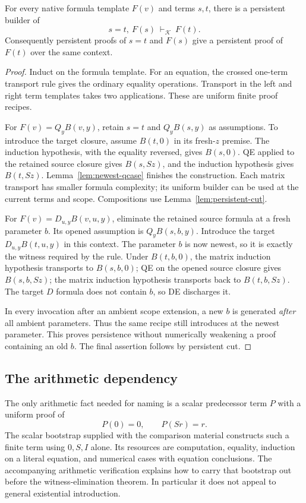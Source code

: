\begin{lemma}
\label{lem:newest-transport}
For every native formula template $F(v)$ and terms $s,t$, there is a
persistent builder of
\[
 s=t,\ F(s)\ \vdash_{\mathcal K}\ F(t).
\]
Consequently persistent proofs of $s=t$ and $F(s)$ give a persistent
proof of $F(t)$ over the same context.
\end{lemma}

\begin{proof}
Induct on the formula template. For an equation, the crossed one-term
transport rule gives the ordinary equality operations. Transport in
the left and right term templates takes two applications. These are
uniform finite proof recipes.

For $F(v)=Q_yB(v,y)$, retain $s=t$ and $Q_yB(s,y)$ as assumptions.
To introduce the target closure, assume $B(t,0)$ in its fresh-$z$
premise. The induction hypothesis, with the equality reversed,
gives $B(s,0)$. QE applied to the retained source closure gives
$B(s,Sz)$, and the induction hypothesis gives $B(t,Sz)$.
Lemma~\ref{lem:newest-qcase} finishes the construction. Each matrix
transport has smaller formula complexity; its uniform builder can be
used at the current terms and scope. Compositions use
Lemma~\ref{lem:persistent-cut}.

For $F(v)=D_{u,y}B(v,u,y)$, eliminate the retained source formula at a
fresh parameter $b$. Its opened assumption is $Q_yB(s,b,y)$.
Introduce the target $D_{u,y}B(t,u,y)$ in this context. The parameter
$b$ is now newest, so it is exactly the witness required by the rule.
Under $B(t,b,0)$, the matrix induction hypothesis transports to
$B(s,b,0)$; QE on the opened source closure gives $B(s,b,Sz)$;
the matrix induction hypothesis transports back to $B(t,b,Sz)$.
The target $D$ formula does not contain $b$, so DE discharges it.

In every invocation after an ambient scope extension, a new $b$ is
generated \emph{after} all ambient parameters. Thus the same recipe
still introduces at the newest parameter. This proves persistence
without numerically weakening a proof containing an old $b$.
The final assertion follows by persistent cut.
\end{proof}

\subsection{The arithmetic dependency}

The only arithmetic fact needed for naming is a scalar predecessor term
$P$ with a uniform proof of
\begin{equation}
 P(0)=0,\qquad P(Sr)=r.
 \label{eq:newest-predecessor}
\end{equation}
The scalar bootstrap supplied with the comparison material constructs
such a finite term using $0,S,I$ alone. Its resources are computation,
equality, induction on a literal equation, and numerical cases with
equation conclusions. The accompanying arithmetic verification explains
how to carry that bootstrap out before the witness-elimination theorem.
In particular it does not appeal to general existential introduction.


